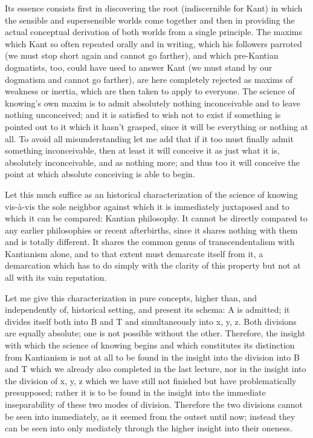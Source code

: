 Its essence consists first in discovering the root (indiscernible for Kant)
in which the sensible and supersensible worlds come together
and then in providing the actual conceptual derivation of both worlds
from a single principle.
The maxims which Kant so often repeated orally and in writing,
which his followers parroted
(we must stop short again and cannot go farther),
and which pre-Kantian dogmatists, too,
could have used to answer Kant
(we must stand by our dogmatism and cannot go farther),
are here completely rejected as maxims of weakness or inertia,
which are then taken to apply to everyone.
The science of knowing's own maxim is
to admit absolutely nothing inconceivable and
to leave nothing unconceived;
and it is satisfied to wish not to exist
if something is pointed out to it which it hasn't grasped,
since it will be everything or nothing at all.
To avoid all misunderstanding let me add that
if it too must finally admit something inconceivable,
then at least it will conceive it as just what it is,
absolutely inconceivable, and as nothing more;
and thus too it will conceive the point at which
absolute conceiving is able to begin.

Let this much suffice as an historical characterization of
the science of knowing vis-à-vis the sole neighbor
against which it is immediately juxtaposed
and to which it can be compared:
Kantian philosophy.
It cannot be directly compared to any
earlier philosophies or recent afterbirths,
since it shares nothing with them and is totally different.
It shares the common genus of transcendentalism with Kantianism alone,
and to that extent must demarcate itself from it,
a demarcation which has to do simply with the clarity of this property
but not at all with its vain reputation.

Let me give this characterization in pure concepts, higher than,
and independently of, historical setting, and present its schema:
A is admitted; it divides itself both into B and T and
simultaneously into x, y, z.
Both divisions are equally absolute;
one is not possible without the other.
Therefore, the insight with which the science of knowing begins and
which constitutes its distinction from Kantianism is not at all
to be found in the insight into the division into B and T
which we already also completed in the last lecture,
nor in the insight into the division of x, y, z
which we have still not finished but have problematically presupposed;
rather it is to be found in the insight into
the immediate inseparability of these two modes of division.
Therefore the two divisions cannot be seen into immediately,
as it seemed from the outset until now;
instead they can be seen into only mediately
through the higher insight into their oneness.


